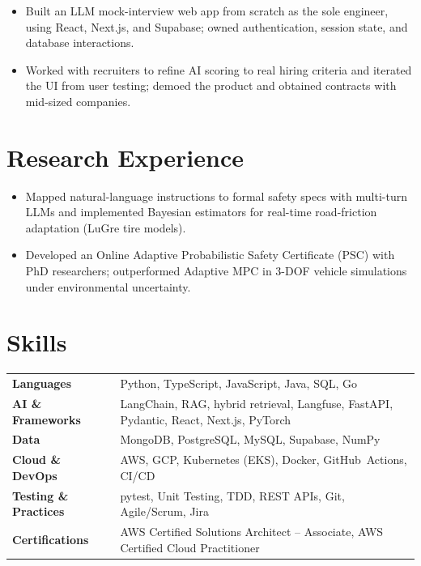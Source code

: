 \documentclass[11pt, letterpaper]{article}
\begin{document}
\vspace{1pt}
\begin{itemize}
  \item Built an LLM mock-interview web app from scratch as the sole engineer, using React, Next.js, and Supabase; owned authentication, session state, and database interactions.
  \item Worked with recruiters to refine AI scoring to real hiring criteria and iterated the UI from user testing; demoed the product and obtained contracts with mid-sized companies.
\end{itemize}

\section{Research Experience}
\begin{itemize}
  \item Mapped natural-language instructions to formal safety specs with multi-turn LLMs and implemented Bayesian estimators for real-time road-friction adaptation (LuGre tire models).
  \item Developed an Online Adaptive Probabilistic Safety Certificate (PSC) with PhD researchers; outperformed Adaptive MPC in 3-DOF vehicle simulations under environmental uncertainty.
\end{itemize}

\section{Skills}
\begin{tabularx}{\textwidth}{@{}l @{\hspace{7pt}} >{\raggedright\arraybackslash}X@{}}
  \textbf{Languages} & Python, TypeScript, JavaScript, Java, SQL, Go \\[1pt]
  \textbf{AI \& Frameworks} & LangChain, RAG, hybrid retrieval, Langfuse, FastAPI, Pydantic, React, Next.js, PyTorch \\[1pt]
  \textbf{Data} & MongoDB, PostgreSQL, MySQL, Supabase, NumPy \\[1pt]
  \textbf{Cloud \& DevOps} & AWS, GCP, Kubernetes (EKS), Docker, GitHub~Actions, CI/CD \\[1pt]
  \textbf{Testing \& Practices} & pytest, Unit Testing, TDD, REST APIs, Git, Agile/Scrum, Jira \\[1pt]
  \textbf{Certifications} & AWS Certified Solutions Architect -- Associate, AWS Certified Cloud Practitioner \\
\end{tabularx}
\end{document}
